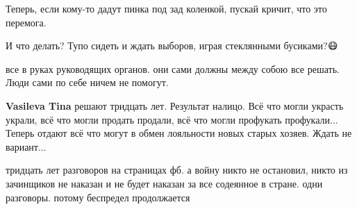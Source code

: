 \begin{itemize}
 
Теперь, если кому-то дадут пинка под зад коленкой, пускай кричит, что это перемога.

 
И что делать?
Тупо сидеть и ждать выборов, играя стеклянными бусиками?😷😤😤😤

\begin{itemize}
 
все в руках руководящих органов. они сами должны между собою все решать. Люди сами по себе ничем не помогут.

 
\textbf{Vasileva Tina} решают тридцать лет.
Результат налицо.
Всё что могли украсть украли, всё что могли продать продали, всё что могли профукать профукали...
Теперь отдают всё что могут в обмен лояльности новых старых хозяев.
Ждать не вариант...

 

тридцать лет разговоров на страницах фб. а войну никто не остановил, никто из
зачинщиков не наказан и не будет наказан за все содеянное в стране. одни
разговоры. потому беспредел продолжается

 

\end{itemize}
\end{itemize}
